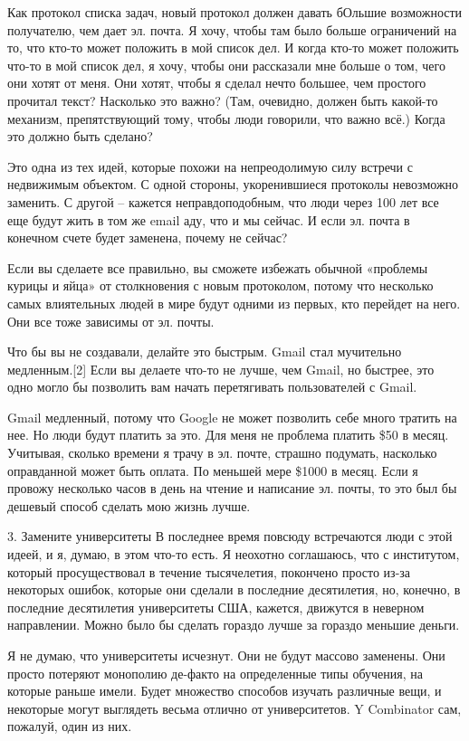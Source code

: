 \documentclass[ebook,12pt,oneside,openany]{memoir}
\begin{document}
Как протокол списка задач, новый протокол должен давать бОльшие
возможности получателю, чем дает эл. почта. Я хочу, чтобы там было
больше ограничений на то, что кто-то может положить в мой список дел.
И когда кто-то может положить что-то в мой список дел, я хочу, чтобы
они рассказали мне больше о том, чего они хотят от меня. Они хотят,
чтобы я сделал нечто большее, чем простого прочитал текст? Насколько
это важно? (Там, очевидно, должен быть какой-то механизм,
препятствующий тому, чтобы люди говорили, что важно всё.) Когда это
должно быть сделано?

Это одна из тех идей, которые похожи на непреодолимую силу встречи с
недвижимым объектом. С одной стороны, укоренившиеся протоколы
невозможно заменить. С другой – кажется неправдоподобным, что люди
через 100 лет все еще будут жить в том же email аду, что и мы сейчас.
И если эл. почта в конечном счете будет заменена, почему не сейчас?

Если вы сделаете все правильно, вы сможете избежать обычной «проблемы
курицы и яйца» от столкновения с новым протоколом, потому что
несколько самых влиятельных людей в мире будут одними из первых, кто
перейдет на него. Они все тоже зависимы от эл. почты.

Что бы вы не создавали, делайте это быстрым. Gmail стал мучительно
медленным.[2] Если вы делаете что-то не лучше, чем Gmail, но быстрее,
это одно могло бы позволить вам начать перетягивать пользователей с
Gmail.

Gmail медленный, потому что Google не может позволить себе много
тратить на нее. Но люди будут платить за это. Для меня не проблема
платить \$50 в месяц. Учитывая, сколько времени я трачу в эл. почте,
страшно подумать, насколько оправданной может быть оплата. По меньшей
мере \$1000 в месяц. Если я провожу несколько часов в день на чтение и
написание эл. почты, то это был бы дешевый способ сделать мою жизнь
лучше.

3. Замените университеты В последнее время повсюду встречаются люди с
этой идеей, и я, думаю, в этом что-то есть. Я неохотно соглашаюсь, что
с институтом, который просуществовал в течение тысячелетия, покончено
просто из-за некоторых ошибок, которые они сделали в последние
десятилетия, но, конечно, в последние десятилетия университеты США,
кажется, движутся в неверном направлении. Можно было бы сделать
гораздо лучше за гораздо меньшие деньги.

Я не думаю, что университеты исчезнут. Они не будут массово заменены.
Они просто потеряют монополию де-факто на определенные типы обучения,
на которые раньше имели. Будет множество способов изучать различные
вещи, и некоторые могут выглядеть весьма отлично от университетов. Y
Combinator сам, пожалуй, один из них.
\end{document}
